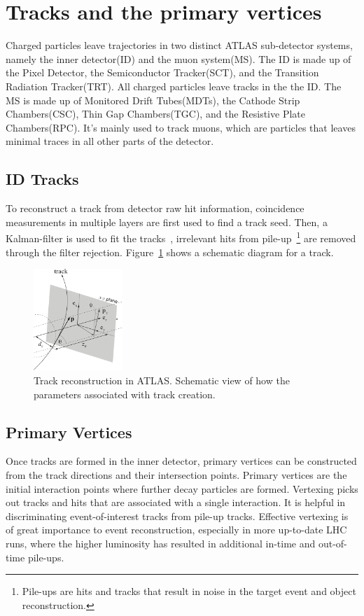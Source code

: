 \section{Tracks and the primary vertices}
\label{sec:Tracks}
Charged particles leave trajectories in two distinct ATLAS sub-detector systems, namely the inner detector(ID) and the muon system(MS). The ID is made up of the Pixel Detector, the Semiconductor Tracker(SCT), and the Transition Radiation Tracker(TRT). All charged particles leave tracks in the the ID. The MS is made up of Monitored Drift Tubes(MDTs), the Cathode Strip Chambers(CSC), Thin Gap Chambers(TGC), and the Resistive Plate Chambers(RPC). It's mainly used to track muons,
which are particles that leaves minimal traces in all other parts of the detector. 

\subsection{ID Tracks}
To reconstruct a track from detector raw hit information, coincidence measurements in multiple layers are first used to find a track seed. Then, a Kalman-filter is used to fit the tracks~\cite{track}, irrelevant hits from pile-up~\footnote{Pile-ups are hits and tracks that result in noise in the target event and object reconstruction.} are removed through the filter rejection.  
Figure~\ref{fig:track} shows a schematic diagram for a track.

\begin{figure}[!htb]
    \begin{center}
        \includegraphics[width=0.3\textwidth]{figures/common_ana/Track}
        \caption{ 
            Track reconstruction in ATLAS. Schematic view of how the parameters associated with track creation.
        }
        \label{fig:track}
    \end{center}
\end{figure}

\subsection{Primary Vertices}
Once tracks are formed in the inner detector, primary vertices can be constructed from the track directions and their intersection points. Primary vertices are the initial interaction points where further decay particles are formed. Vertexing picks out tracks and hits that are associated with a single interaction. It is helpful in discriminating event-of-interest tracks from pile-up tracks. Effective vertexing is of great importance to event reconstruction, especially in more up-to-date
LHC runs, where the higher luminosity has resulted in additional in-time and out-of-time pile-ups.

